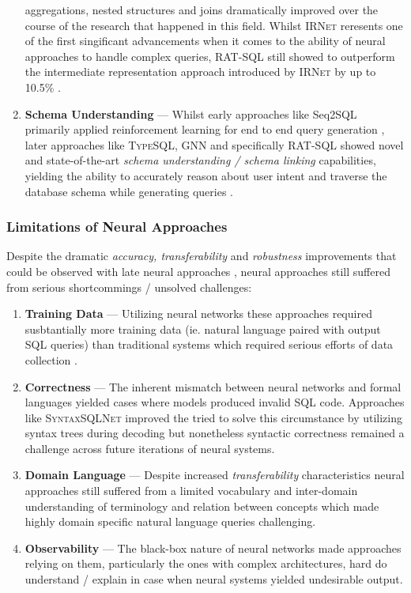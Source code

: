 \documentclass{article}
\begin{document}
\begin{enumerate}
          aggregations, nested structures and joins dramatically improved over the course of the research that happened in this 
          field. Whilst \textsc{IRNet} reresents one of the first singificant advancements when it comes to the ability of neural 
          approaches to handle complex queries, \textsc{RAT-SQL} still showed to outperform the intermediate representation 
          approach introduced by \textsc{IRNet} by up to 10.5\% \citep{IRNet, RATSQL}.
    \item \textbf{Schema Understanding} — Whilst early approaches like Seq2SQL primarily applied reinforcement learning for end to 
          end query generation \citep{Seq2SQL}, later approaches like \textsc{TypeSQL, GNN} and specifically \textsc{RAT-SQL} 
          showed novel and state-of-the-art \textit{schema understanding / schema linking} capabilities, yielding the ability to 
          accurately reason about user intent and traverse the database schema while generating queries \citep{TypeSQL, GNN, 
          RATSQL}. 
\end{enumerate}

\subsubsection{Limitations of Neural Approaches}

Despite the dramatic \textit{accuracy, transferability} and \textit{robustness} improvements that could be observed with late
neural approaches \citep{IRNet, RATSQL}, neural approaches still suffered from serious shortcommings / unsolved challenges:

\begin{enumerate}
    \item \textbf{Training Data} — Utilizing neural networks these approaches required susbtantially more training data 
          (ie. natural language paired with output SQL queries) than traditional systems which required serious efforts of data 
          collection \citep{Spider}.
    \item \textbf{Correctness} — The inherent mismatch between neural networks and formal languages yielded cases where models 
          produced invalid SQL code. Approaches like \textsc{SyntaxSQLNet} improved the tried to solve this circumstance by 
          utilizing syntax trees during decoding but nonetheless syntactic correctness remained a challenge across future
          iterations of neural systems. \citep{SyntaxSQLNet}
    \item \textbf{Domain Language} — Despite increased \textit{transferability} characteristics neural approaches still suffered
          from a limited vocabulary and inter-domain understanding of terminology and relation between concepts which made highly 
          domain specific natural language queries challenging.
    \item \textbf{Observability} — The black-box nature of neural networks made approaches relying on them, particularly the ones 
          with complex architectures, hard do understand / explain in case when neural systems yielded undesirable output. 
\end{enumerate}
\end{document}
